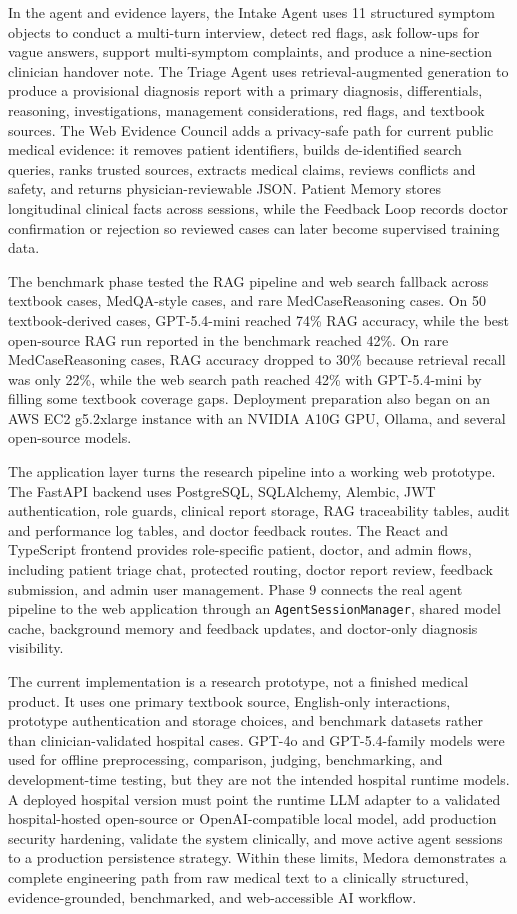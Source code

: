 In the agent and evidence layers, the Intake Agent uses 11 structured symptom objects to conduct a multi-turn interview, detect red flags, ask follow-ups for vague answers, support multi-symptom complaints, and produce a nine-section clinician handover note. The Triage Agent uses retrieval-augmented generation to produce a provisional diagnosis report with a primary diagnosis, differentials, reasoning, investigations, management considerations, red flags, and textbook sources. The Web Evidence Council adds a privacy-safe path for current public medical evidence: it removes patient identifiers, builds de-identified search queries, ranks trusted sources, extracts medical claims, reviews conflicts and safety, and returns physician-reviewable JSON. Patient Memory stores longitudinal clinical facts across sessions, while the Feedback Loop records doctor confirmation or rejection so reviewed cases can later become supervised training data.

The benchmark phase tested the RAG pipeline and web search fallback across textbook cases, MedQA-style cases, and rare MedCaseReasoning cases. On 50 textbook-derived cases, GPT-5.4-mini reached 74\% RAG accuracy, while the best open-source RAG run reported in the benchmark reached 42\%. On rare MedCaseReasoning cases, RAG accuracy dropped to 30\% because retrieval recall was only 22\%, while the web search path reached 42\% with GPT-5.4-mini by filling some textbook coverage gaps. Deployment preparation also began on an AWS EC2 g5.2xlarge instance with an NVIDIA A10G GPU, Ollama, and several open-source models.

The application layer turns the research pipeline into a working web prototype. The FastAPI backend uses PostgreSQL, SQLAlchemy, Alembic, JWT authentication, role guards, clinical report storage, RAG traceability tables, audit and performance log tables, and doctor feedback routes. The React and TypeScript frontend provides role-specific patient, doctor, and admin flows, including patient triage chat, protected routing, doctor report review, feedback submission, and admin user management. Phase 9 connects the real agent pipeline to the web application through an \texttt{AgentSessionManager}, shared model cache, background memory and feedback updates, and doctor-only diagnosis visibility.

The current implementation is a research prototype, not a finished medical product. It uses one primary textbook source, English-only interactions, prototype authentication and storage choices, and benchmark datasets rather than clinician-validated hospital cases. GPT-4o and GPT-5.4-family models were used for offline preprocessing, comparison, judging, benchmarking, and development-time testing, but they are not the intended hospital runtime models. A deployed hospital version must point the runtime LLM adapter to a validated hospital-hosted open-source or OpenAI-compatible local model, add production security hardening, validate the system clinically, and move active agent sessions to a production persistence strategy. Within these limits, Medora demonstrates a complete engineering path from raw medical text to a clinically structured, evidence-grounded, benchmarked, and web-accessible AI workflow.
